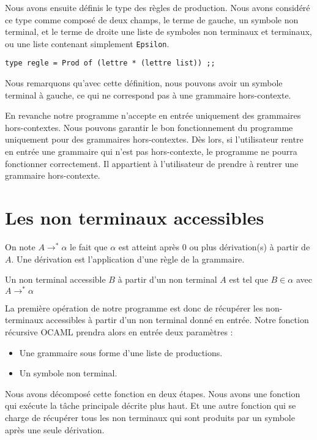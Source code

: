 \documentclass[11pt,a4paper]{article}
\def\code#1{\texttt{#1}} %
\begin{document}
Nous avons ensuite définis le type des règles de production.
Nous avons considéré ce type comme composé de deux champs, le
terme de gauche, un symbole non terminal, et le terme de droite
une liste de symboles non terminaux et terminaux, ou une liste 
contenant simplement \code{Epsilon}.

\begin{verbatim}
type regle = Prod of (lettre * (lettre list)) ;;
\end{verbatim}

Nous remarquons qu'avec cette définition, nous pouvons
avoir un symbole terminal à gauche, ce qui ne correspond pas
à une grammaire hors-contexte.

En revanche notre programme n'accepte en entrée uniquement des
grammaires hors-contextes. Nous pouvons garantir le bon fonctionnement
du programme uniquement pour des grammaires hors-contextes.
Dès lors, si l'utilisateur rentre en entrée une grammaire qui
n'est pas hors-contexte, le programme ne pourra fonctionner 
correctement. Il appartient à l'utilisateur de prendre à rentrer
une grammaire hors-contexte.

\newpage


\section{Les non terminaux accessibles}

On note $A \rightarrow^* \alpha$ le fait que $\alpha$ est atteint après 
0 ou plus dérivation(s) à partir de $A$. Une dérivation est l'application d'une règle de la grammaire.

Un non terminal accessible $B$ à partir d'un non terminal $A$ est tel que
$B \in \alpha$ avec $A \rightarrow^* \alpha$
\newline

La première opération de notre programme est donc de récupérer les
non-terminaux accessibles à partir d'un non terminal donné 
en entrée. Notre fonction récursive OCAML prendra alors en 
entrée deux paramètres : 
\begin{itemize}
    \item Une grammaire sous forme d'une liste de productions.
    \item Un symbole non terminal.
\end{itemize}

Nous avons décomposé cette fonction en deux étapes. Nous avons une 
fonction qui exécute la tâche principale décrite plus haut. Et une 
autre fonction qui se charge de récupérer tous les non terminaux
qui sont produits par un symbole après une seule dérivation.
\end{document}
